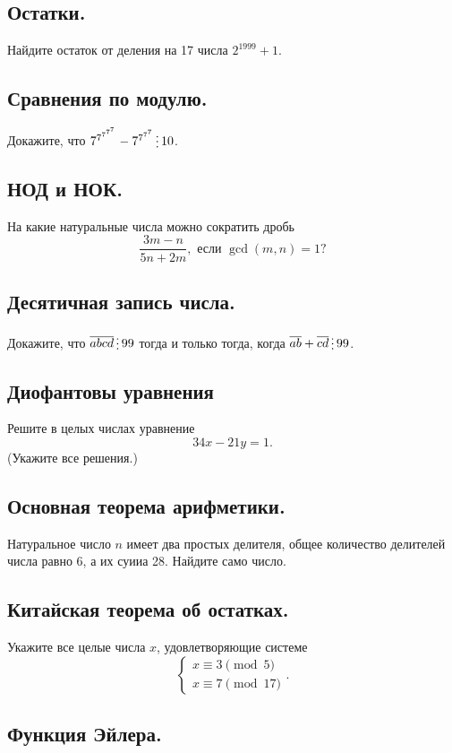\documentclass[12pt]{article}
\newcommand{\divisible}{\mathop{\raisebox{-2pt}{\vdots}}}
\begin{document}
    \subsection*{Остатки.}
        Найдите остаток от деления на 17 числа $2^{1999} + 1$.
    \subsection*{Сравнения по модулю.}
        Докажите, что $7^{7^{7^{7^{7}}}} - 7^{7^{7^{7}}} \divisible 10$.
    \subsection*{НОД и НОК.}
        На какие натуральные числа можно сократить дробь
        \[ \frac{3m - n}{5n + 2m}, \text{ если } \gcd(m, n)  = 1?\]
    \subsection*{Десятичная запись числа.}
        Докажите, что $\overline{abcd} \divisible 99$ тогда и только тогда, когда $\overline{ab} + \overline{cd} \divisible 99$.
    \subsection*{Диофантовы уравнения}
        Решите в целых числах уравнение
        \[ 34x - 21y = 1.\]
        (Укажите все решения.)
    \subsection*{Основная теорема арифметики.}
        Натуральное число $n$ имеет два простых делителя, общее количество делителей числа равно 6, а их суииа 28. Найдите само число.
    \subsection*{Китайская теорема об остатках.}
    Укажите все целые числа $x$, удовлетворяющие системе
    \[ \begin{cases} x \equiv 3 \pmod{5} \\ x \equiv 7 \pmod{17} \end{cases}.\]
    \subsection*{Функция Эйлера.}
    \pagestyle{empty}
\end{document}
